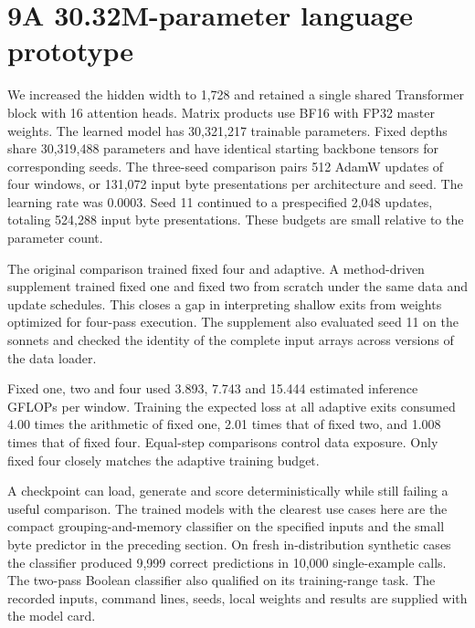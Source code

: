\section*{9\quad A 30.32M-parameter language prototype}
We increased the hidden width to 1,728 and retained a single shared Transformer block with 16 attention heads. Matrix products use BF16 with FP32 master weights. The learned model has 30,321,217 trainable parameters. Fixed depths share 30,319,488 parameters and have identical starting backbone tensors for corresponding seeds. The three-seed comparison pairs 512 AdamW updates of four windows, or 131,072 input byte presentations per architecture and seed. The learning rate was 0.0003. Seed 11 continued to a prespecified 2,048 updates, totaling 524,288 input byte presentations. These budgets are small relative to the parameter count.

The original comparison trained fixed four and adaptive. A method-driven supplement trained fixed one and fixed two from scratch under the same data and update schedules. This closes a gap in interpreting shallow exits from weights optimized for four-pass execution. The supplement also evaluated seed 11 on the sonnets and checked the identity of the complete input arrays across versions of the data loader.\par


Fixed one, two and four used 3.893, 7.743 and 15.444 estimated inference GFLOPs per window. Training the expected loss at all adaptive exits consumed 4.00 times the arithmetic of fixed one, 2.01 times that of fixed two, and 1.008 times that of fixed four. Equal-step comparisons control data exposure. Only fixed four closely matches the adaptive training budget.


 A checkpoint can load, generate and score deterministically while still failing a useful comparison. The trained models with the clearest use cases here are the compact grouping-and-memory classifier on the specified inputs and the small byte predictor in the preceding section. On fresh in-distribution synthetic cases the classifier produced 9,999 correct predictions in 10,000 single-example calls. The two-pass Boolean classifier also qualified on its training-range task. The recorded inputs, command lines, seeds, local weights and results are supplied with the model card.
